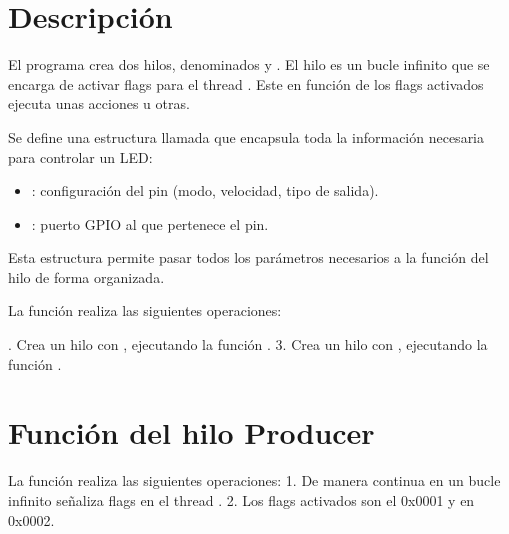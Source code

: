 \documentclass[letterpaper,10pt,english]{sphinxmanual}
\begin{document}
\section{Descripción}
\label{\detokenize{ejemplothreads-flags:descripcion}}
\sphinxAtStartPar
El programa crea dos hilos, denominados  y .  El hilo  es un bucle infinito que se encarga de activar flags para el thread . Este en función de los flags activados ejecuta unas acciones u otras.

\sphinxAtStartPar
Se define una estructura llamada  que encapsula toda la información necesaria para controlar un LED:
\begin{itemize}
\item {} 
\sphinxAtStartPar
{}: configuración del pin (modo, velocidad, tipo de salida).

\item {} 
\sphinxAtStartPar
{}: puerto GPIO al que pertenece el pin.

\end{itemize}

\sphinxAtStartPar
Esta estructura permite pasar todos los parámetros necesarios a la función del hilo de forma organizada.

\sphinxAtStartPar
La función  realiza las siguientes operaciones:

. Crea un hilo  con , ejecutando la función .
3. Crea un hilo  con , ejecutando la función .


\section{Función del hilo Producer}
\label{\detokenize{ejemplothreads-flags:funcion-del-hilo-producer}}
\sphinxAtStartPar
La función  realiza las siguientes operaciones:
1. De manera continua en un bucle infinito señaliza flags en el thread .
2. Los flags activados son el 0x0001 y en 0x0002.
\end{document}
